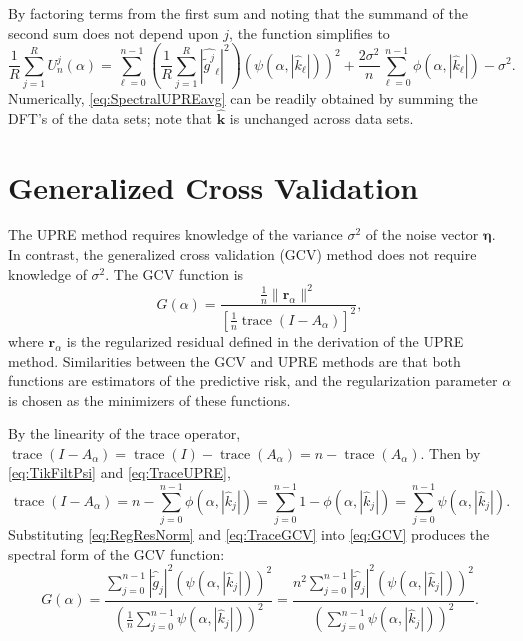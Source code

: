 \documentclass[12pt,notitlepage]{report}
\newcommand{\gnoise}{\widetilde{g}}	%
\newcommand{\kVec}{\mathbf{k}}	%
\DeclareMathOperator{\trace}{trace}		%
\newcommand{\regparam}{\alpha}
\newcommand{\filt}{\phi}
\newcommand{\mfilt}{\psi}
\newcommand{\noise}{\eta}	%
\newcommand{\noiseSD}{\sigma}	%
\newcommand{\noiseVec}{\bm{\noise}}	%
\newcommand{\regres}{\mathbf{r}_{\regparam}}	%
\newcommand{\A}{A_{\regparam}}	%
\newcommand{\U}{U}	%
\newcommand{\GCV}{G}	%
\begin{document}
By factoring terms from the first sum and noting that the summand of the second sum does not depend upon $j$, the function simplifies to
\begin{equation}
\frac{1}{R}\sum_{j=1}^R \U_n^j(\regparam) =  \sum_{\ell = 0}^{n-1} \left(\frac{1}{R}\sum_{j=1}^R |\widehat{\gnoise^j}_\ell|^2\right)(\mfilt(\regparam,|\widehat{k}_\ell|))^2 + \frac{2\noiseSD^2}{n}\sum_{\ell = 0}^{n-1} \filt(\regparam,|\widehat{k}_\ell|) - \noiseSD^2.
\label{eq:SpectralUPREavg}
\end{equation}
Numerically, \eqref{eq:SpectralUPREavg} can be readily obtained by summing the DFT's of the data sets; note that $\widehat{\kVec}$ is unchanged across data sets.

\section{Generalized Cross Validation} \label{sec:Generalized Cross Validation}
The UPRE method requires knowledge of the variance $\noiseSD^2$ of the noise vector $\noiseVec$. In contrast, the generalized cross validation (GCV) method does not require knowledge of $\noiseSD^2$. The GCV function is
\begin{equation}
\label{eq:GCV}
\GCV(\regparam) = \frac{\frac{1}{n}\|\regres\|^2}{\left[\frac{1}{n}\trace(I-\A)\right]^2},
\end{equation}
where $\regres$ is the regularized residual defined in the derivation of the UPRE method. Similarities between the GCV and UPRE methods are that both functions are estimators of the predictive risk, and the regularization parameter $\regparam$ is chosen as the minimizers of these functions. \par 
By the linearity of the trace operator, $\trace(I-\A) = \trace(I)-\trace(\A) = n - \trace(\A)$. Then by \eqref{eq:TikFiltPsi} and \eqref{eq:TraceUPRE},
\begin{equation}
\trace(I-\A) = n - \sum_{j = 0}^{n-1} \filt(\regparam,|\widehat{k}_j|) = \sum_{j = 0}^{n-1} 1 - \filt(\regparam,|\widehat{k}_j|) = \sum_{j = 0}^{n-1} \mfilt(\regparam,|\widehat{k}_j|).
\label{eq:TraceGCV}
\end{equation}
Substituting \eqref{eq:RegResNorm} and \eqref{eq:TraceGCV} into \eqref{eq:GCV} produces the spectral form of the GCV function:
\begin{equation}
\GCV(\regparam) = \frac{\sum_{j = 0}^{n-1} |\widehat{\gnoise}_j|^2(\mfilt(\regparam,|\widehat{k}_j|))^2}{(\frac{1}{n}\sum_{j = 0}^{n-1} \mfilt(\regparam,|\widehat{k}_j|))^2} = \frac{n^2\sum_{j = 0}^{n-1} |\widehat{\gnoise}_j|^2(\mfilt(\regparam,|\widehat{k}_j|))^2}{(\sum_{j = 0}^{n-1} \mfilt(\regparam,|\widehat{k}_j|))^2}.
\label{eq:SpectralGCV}
\end{equation} \par 
\end{document}

